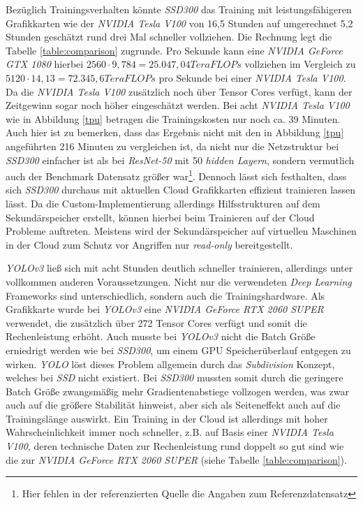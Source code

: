Bezüglich Trainingsverhalten könnte \textit{SSD300} das Training mit leistungsfähigeren Grafikkarten wie der \textit{NVIDIA Tesla V100} von 16,5 Stunden auf umgerechnet 5,2 Stunden geschätzt rund drei Mal schneller vollziehen. Die Rechnung legt die Tabelle \ref{table:comparison} zugrunde. Pro Sekunde kann eine \textit{NVIDIA GeForce GTX 1080} hierbei $2560\cdot 9,784 = 25.047,04 TeraFLOPs$ vollziehen im Vergleich zu $5120\cdot 14,13 = 72.345,6 TeraFLOPs$ pro Sekunde bei einer \textit{NVIDIA Tesla V100}. Da die \textit{NVIDIA Tesla V100} zusätzlich noch über Tensor Cores verfügt, kann der Zeitgewinn sogar noch höher eingeschätzt werden. Bei acht \textit{NVIDIA Tesla V100} wie in Abbildung \ref{tpu} betragen die Trainingskosten nur noch ca. 39 Minuten. Auch hier ist zu bemerken, dass das Ergebnis nicht mit den in Abbildung \ref{tpu} angeführten 216 Minuten zu vergleichen ist, da nicht nur die Netzstruktur bei \textit{SSD300} einfacher ist als bei \textit{ResNet-50} mit 50 \textit{hidden Layern}, sondern vermutlich auch der Benchmark Datensatz größer war\footnote{Hier fehlen in der referenzierten Quelle die Angaben zum Referenzdatensatz}. Dennoch lässt sich festhalten, dass sich \textit{SSD300} durchaus mit aktuellen Cloud Grafikkarten effizient trainieren lassen lässt. Da die Custom-Implementierung allerdings Hilfsstrukturen auf dem Sekundärspeicher erstellt, können hierbei beim Trainieren auf der Cloud Probleme auftreten. Meistens wird der Sekundärspeicher auf virtuellen Maschinen in der Cloud zum Schutz vor Angriffen nur \textit{read-only} bereitgestellt. 

\textit{YOLOv3} ließ sich mit acht Stunden deutlich schneller trainieren, allerdings unter vollkommen anderen Voraussetzungen. Nicht nur die verwendeten \textit{Deep Learning} Frameworks sind unterschiedlich, sondern auch die Trainingshardware. Als Grafikkarte wurde bei \textit{YOLOv3} eine \textit{NVIDIA GeForce RTX 2060 SUPER} verwendet, die zusätzlich über 272 Tensor Cores verfügt und somit die Rechenleistung erhöht. Auch musste bei \textit{YOLOv3} nicht die Batch Größe erniedrigt werden wie bei \textit{SSD300}, um einem GPU Speicherüberlauf entgegen zu wirken. \textit{YOLO} löst dieses Problem allgemein durch das \textit{Subdivision} Konzept, welches bei \textit{SSD} nicht existiert. Bei \textit{SSD300} mussten somit durch die geringere Batch Größe zwangsmäßig mehr Gradientenabstiege vollzogen werden, was zwar auch auf die größere Stabilität hinweist, aber sich als Seiteneffekt auch auf die Trainingslänge auswirkt. Ein Training in der Cloud ist allerdings mit hoher Wahrscheinlichkeit immer noch schneller, z.B. auf Basis einer \textit{NVIDIA Tesla V100}, deren technische Daten zur Rechenleistung rund doppelt so gut sind wie die zur \textit{NVIDIA GeForce RTX 2060 SUPER} (siehe Tabelle \ref{table:comparison}). 

